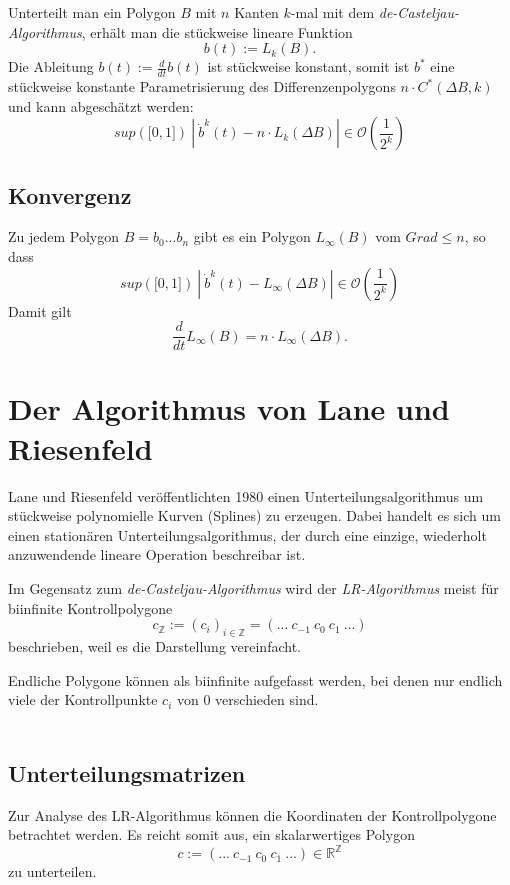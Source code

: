Unterteilt man ein Polygon \(B\) mit \(n\) Kanten \(k\)-mal mit dem \textit{de-Casteljau-Algorithmus}, erhält man die stückweise lineare Funktion
\[b(t) := L_k(B).\]
Die Ableitung \(b(t) := \frac{d}{dt}b(t)\) ist stückweise konstant, somit ist \(b^*\) eine stückweise konstante Parametrisierung des Differenzenpolygons \(n \cdot C^*(\Delta B,k)\) und kann abgeschätzt werden:
\[sup(\lbrack0,1\rbrack)~|~\dot{b}^k(t)-n\cdot L_k(\Delta B)|\in \mathcal{O}(\frac{1}{2^k})\]


\subsection{Konvergenz}
Zu jedem Polygon \(B=b_0...b_n\) gibt es ein Polygon \(L_{\infty}(B)\) vom \(Grad \leq n\), so dass
\[sup(\lbrack0,1\rbrack)~|~\dot{b}^k(t)-L_{\infty}(\Delta B)|\in \mathcal{O}(\frac{1}{2^k})\]
Damit gilt
\[\frac{d}{dt}L_{\infty}(B) = n \cdot L_{\infty}(\Delta B).\]



\section{Der Algorithmus von Lane und Riesenfeld}
Lane und Riesenfeld veröffentlichten 1980 einen Unterteilungsalgorithmus um stückweise polynomielle Kurven (Splines) zu erzeugen. Dabei handelt es sich um einen stationären Unterteilungsalgorithmus, der durch eine einzige, wiederholt anzuwendende lineare Operation beschreibar ist.

Im Gegensatz zum \textit{de-Casteljau-Algorithmus} wird der \textit{LR-Algorithmus} meist für biinfinite Kontrollpolygone
\[c_{\mathbb{Z}} := (c_i)_{i \in \mathbb{Z}} = (...~c_{-1}~c_0~c_1~...)\]
beschrieben, weil es die Darstellung vereinfacht.

Endliche Polygone können als biinfinite aufgefasst werden, bei denen nur endlich viele der Kontrollpunkte \(c_i\) von \(0\) verschieden sind.
\text{}\\\\



\subsection{Unterteilungsmatrizen}
Zur Analyse des LR-Algorithmus können die Koordinaten der Kontrollpolygone betrachtet werden. Es reicht somit aus, ein skalarwertiges Polygon
\[c := (...~c_{-1}~c_0~c_1~...) \in \mathbb{R}^{\mathbb{Z}}\]
zu unterteilen.

